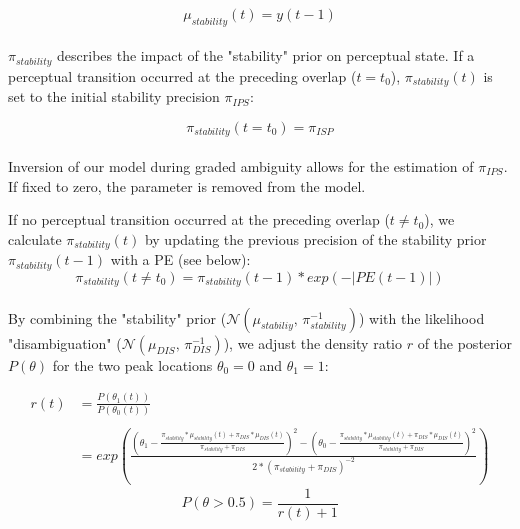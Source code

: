 \documentclass[12pt]{article}
\begin{document}
\begin{equation}
 \mu_{stability}(t) = y(t-1)
\end{equation} \\ 

$\pi_{stability}$ describes the impact of the "stability" prior on perceptual state. If a perceptual transition occurred at the preceding overlap ($t=t_0$), $\pi_{stability}(t)$ is set to the initial stability precision $\pi_{IPS}$:

\begin{equation}
 \pi_{stability}(t = t_0) = \pi_{ISP}
\end{equation} \\

Inversion of our model during graded ambiguity allows for the estimation of $\pi_{IPS}$. If fixed to zero, the parameter is removed from the model. 

If no perceptual transition occurred at the preceding overlap ($t \neq t_0$), we calculate $\pi_{stability}(t)$ by updating the previous precision of the stability prior $\pi_{stability}(t-1)$ with a PE (see below):
\begin{equation}
 \pi_{stability}(t \neq t_0) = \pi_{stability}(t-1)*exp(-|PE(t-1)|)
\end{equation} \\

By combining the "stability" prior ($\mathcal{N}(\mu_{stabiliy},\,\pi_{stability}^{-1})$) with the likelihood "disambiguation" ($\mathcal{N}(\mu_{DIS},\,\pi_{DIS}^{-1})$), we adjust the density ratio $r$ of the posterior $P(\theta)$ for the two peak locations $\theta_0 = 0$ and $\theta_1 = 1$:

\begin{equation}
\begin{split}
r(t) &=\frac{P(\theta_1(t))}{P(\theta_0(t))} \\
     & \\
     &=exp(\frac{(\theta_1- \frac{\pi_{stability} * \mu_{stability}(t) + \pi_{DIS} * \mu_{DIS}(t)}{\pi_{stability} + \pi_{DIS}})^{2}-(\theta_0-\frac{\pi_{stability}*\mu_{stability}(t) + \pi_{DIS}*\mu_{DIS}(t)}{\pi_{stability} + \pi_{DIS}})^{2}}{2 * (\pi_{stability}+\pi_{DIS})^{-2}})
\end{split}
\end{equation}
\begin{equation}
P(\theta > 0.5)=\frac{1}{r(t)+1}
\end{equation} \\
\end{document}

